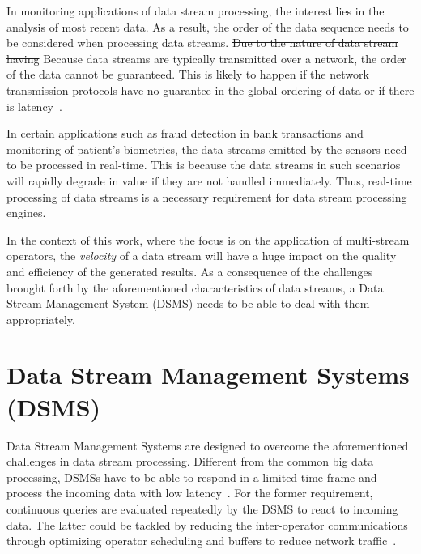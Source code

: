 In monitoring applications of data stream processing, the interest lies in the analysis of 
most recent data. As a result, the order of the data sequence needs to be considered 
when processing data streams. \sout{Due to the nature of data stream having}
Because data streams are typically transmitted over a 
network, the order of the data cannot be guaranteed. This is 
likely to happen if the network transmission protocols have no guarantee in the global 
ordering of data or if there is latency~\cite{requirements_dsp}. 

In certain applications such as fraud detection in bank transactions and monitoring of 
patient's biometrics, the data streams emitted by the sensors need to be processed in 
real-time. This is because the data streams in such scenarios will rapidly degrade in 
value if they are not handled immediately. Thus, real-time processing of data streams 
is a necessary requirement for data stream processing engines. 

In the context of this work, where the focus is on the application of multi-stream operators, 
the \emph{velocity} of a data stream will have a huge impact on the quality and efficiency of 
the generated results. As a consequence of the challenges brought forth by the 
aforementioned characteristics of data streams, a Data Stream Management System (DSMS) needs 
to be able to deal with them appropriately.

\section{Data Stream Management Systems (DSMS)} 
Data Stream Management Systems are designed to overcome the aforementioned challenges 
in data stream processing. Different from the common big data processing, DSMSs have to be 
able to respond in a limited time frame and process the incoming data with low latency~\cite{data_stream_management}. 
For the former requirement, continuous queries are evaluated repeatedly by the DSMS to react 
to incoming data. The latter could be tackled by reducing the inter-operator communications 
through optimizing operator scheduling and buffers to reduce network traffic~\cite{low_latency_data_stream}. 



